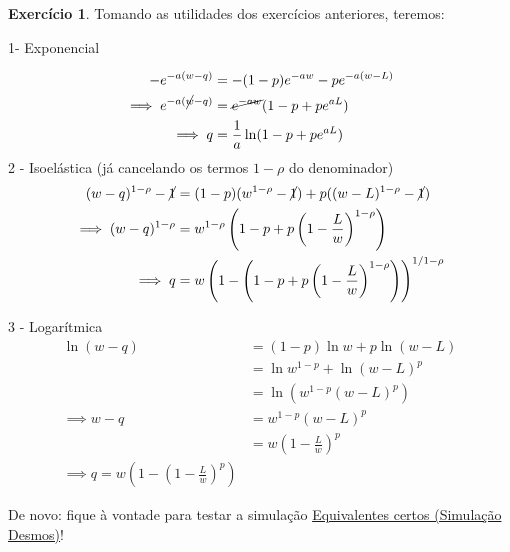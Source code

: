 \documentclass[12pt]{article}
\numberwithin{equation}{section}
\theoremstyle{plain}
\theoremstyle{definition}
\newtheorem{exercise}{Exercício}
\theoremstyle{remark}
\begin{document}
\begin{exercise}
Tomando as utilidades dos exercícios anteriores, teremos: 

1- Exponencial

\begin{align*}
-e^{-a(w-q)} &= -(1-p)e^{-aw} - pe^{-a(w-L)} \\
\implies e^{-a(\cancel{ w }-q)} &= \cancel{ e^{-aw} }(1-p + p e^{aL}) \\
\implies q &= \frac{1}{a}\ln(1-p+pe^{aL})
\end{align*} 2 - Isoelástica (já cancelando os termos \(1-\rho\) do
denominador) \begin{align*}
(w-q)^{1-\rho}-\cancel{ 1 } &= (1-p)(w^{1-\rho}-\cancel{ 1 }) + p ((w-L)^{1-\rho}-\cancel{ 1 }) \\
\implies (w-q)^{1-\rho} &= w^{1-\rho}\left( 1-p + p \left( 1-\frac{L}{w} \right)^{1-\rho} \right) \\
\implies q &= w \left(1- \left( 1-p + p \left( 1-\frac{L}{w} \right)^{1-\rho} \right)\right)^{1/1-\rho}
\end{align*}

3 - Logarítmica \begin{align*}
\ln(w-q) &= (1-p)\ln w + p\ln(w-L) \\
&=\ln w^{1-p}+ \ln(w-L)^{p} \\
&= \ln(w^{1-p}(w-L)^{p})\\
\implies w-q &= w ^{1-p} (w-L)^{p} \\
&= w \left( 1-\frac{L}{w} \right)^{p}\\
\implies q = w\left( 1-\left( 1-\frac{L}{w} \right)^{p} \right)
\end{align*}

De novo: fique à vontade para testar a simulação
\href{https://www.desmos.com/calculator/quce5bk5v5}{Equivalentes certos
(Simulação Desmos)}!
\end{exercise}




\printbibliography
\end{document}
